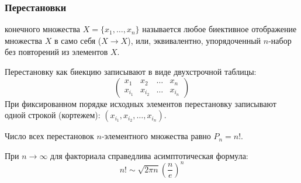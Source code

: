 \subsubsection{Перестановки}

\begin{definition}
     конечного множества $X = \{x_1, \dots, x_n\}$ 
    называется любое биективное отображение множества $X$ в само себя 
    ($X \to X$), или, эквивалентно, упорядоченный $n$-набор без повторений 
    из элементов $X$.
\end{definition}

\begin{designation}
    Перестановку как биекцию записывают в виде двухстрочной таблицы:
    \[
        \begin{pmatrix} 
            x_1 & x_2 & \dots & x_n \\ 
            x_{i_1} & x_{i_2} & \dots & x_{i_n} 
        \end{pmatrix}
    \]
    При фиксированном порядке исходных элементов перестановку записывают 
    одной строкой (кортежем): $(x_{i_1}, x_{i_2}, \dots, x_{i_n})$.
\end{designation}

\begin{proposition}
    Число всех перестановок $n$-элементного множества равно $P_n = n!$.
\end{proposition}

\begin{theorem}
    При $n \to \infty$ для факториала справедлива асимптотическая формула:
    \begin{equation} \label{eq:stirling}
        n! \sim \sqrt{2 \pi n} \left(\frac{n}{e}\right)^n \tag{7}
    \end{equation}
\end{theorem}

